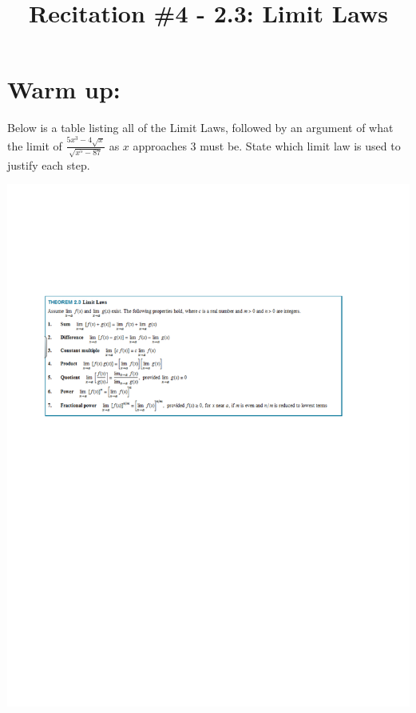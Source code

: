 \documentclass[handout,nooutcomes]{ximera}
\title{Recitation \#4 - 2.3:  Limit Laws}
\begin{document}
\begin{abstract}		\end{abstract}
\maketitle

\section*{Warm up:} 
Below is a table listing all of the Limit Laws, followed by an argument of what the limit of $ \frac{5x^3 - 4 \sqrt{x}}{\sqrt{x^5 - 87}}  $ as $x$ approaches 3 must be.  State which limit law is used to justify each step.

	\begin{image}
	\includegraphics[trim= 250 440 300 175]{Figure1.pdf}
	\end{image}
\end{document}
